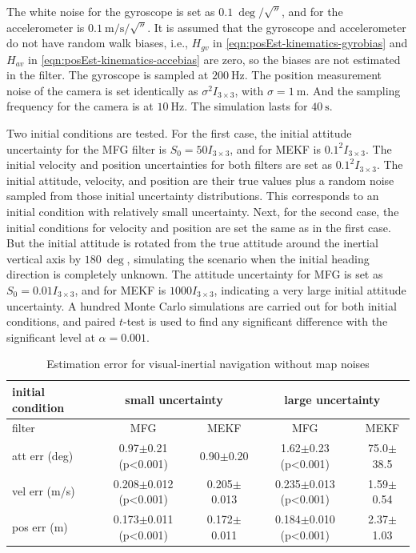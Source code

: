 The white noise for the gyroscope is set as $\SI{0.1}{\deg/\sqrt{\second}}$, and for the accelerometer is $\SI{0.1}{\meter/\second/\sqrt{\second}}$.
It is assumed that the gyroscope and accelerometer do not have random walk biases, i.e., $H_{gv}$ in \eqref{eqn:posEst-kinematics-gyrobias} and $H_{av}$ in \eqref{eqn:posEst-kinematics-accebias} are zero, so the biases are not estimated in the filter.
The gyroscope is sampled at $\SI{200}{\hertz}$.
The position measurement noise of the camera is set identically as $\sigma^2I_{3\times 3}$, with $\sigma = \SI{1}{\meter}$.
And the sampling frequency for the camera is at $\SI{10}{\hertz}$.
The simulation lasts for $\SI{40}{\second}$.

Two initial conditions are tested.
For the first case, the initial attitude uncertainty for the MFG filter is $S_0 = 50I_{3\times 3}$, and for MEKF is $0.1^2I_{3\times 3}$.
The initial velocity and position uncertainties for both filters are set as $0.1^2I_{3\times 3}$.
The initial attitude, velocity, and position are their true values plus a random noise sampled from those initial uncertainty distributions.
This corresponds to an initial condition with relatively small uncertainty.
Next, for the second case, the initial conditions for velocity and position are set the same as in the first case.
But the initial attitude is rotated from the true attitude around the inertial vertical axis by $\SI{180}{\deg}$, simulating the scenario when the initial heading direction is completely unknown.
The attitude uncertainty for MFG is set as $S_0 = 0.01I_{3\times 3}$, and for MEKF is $1000I_{3\times 3}$, indicating a very large initial attitude uncertainty.
A hundred Monte Carlo simulations are carried out for both initial conditions, and paired $t$-test is used to find any significant difference with the significant level at $\alpha = 0.001$.

\begin{table}
	\centering
	\footnotesize
	\caption{Estimation error for visual-inertial navigation without map noises}
	\label{tab:VIO-filter-error}
	\begin{tabular}{l|c|c|c|c}
		\hline\hline
		initial condition & \multicolumn{2}{c|}{small uncertainty} & \multicolumn{2}{c}{large uncertainty} \\ \hline
		filter & MFG & MEKF & MFG & MEKF \\ \hline
		att err (deg) & 0.97$\pm$0.21 (p<0.001) & 0.90$\pm$0.20 & 1.62$\pm$0.23 (p<0.001) & 75.0$\pm$38.5 \\
		vel err (m/s) & 0.208$\pm$0.012 (p<0.001) & 0.205$\pm$0.013 & 0.235$\pm$0.013 (p<0.001) & 1.59$\pm$0.54 \\
		pos err (m) & 0.173$\pm$0.011 (p<0.001) & 0.172$\pm$0.011 & 0.184$\pm$0.010 (p<0.001) & 2.37$\pm$1.03 \\
		\hline\hline
	\end{tabular}
\end{table}


